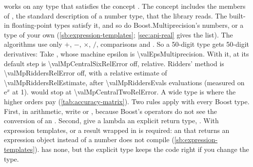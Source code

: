  works on any type that satisfies the concept . The concept includes the members of
, the standard description of a number type, that the library reads. The built-in
floating-point types satisfy it, and so do Boost.Multiprecision's numbers, or a type of your own
(\cref{sb:expression-templates}; \cref{sec:api-real} gives the list). The algorithms use only $+$, $-$, $\times$,
$/$, comparisons and . So a 50-digit type gets 50-digit derivatives:
Take , whose machine epsilon is \num{\valEpsMultiprecision}. With it,  at its
default step is \num{\valMpCentralSixRelError} off, relative. Ridders' method is \num{\valMpRiddersRelError} off, with
a relative estimate of \num{\valMpRiddersRelEstimate}, after \num{\valMpRiddersEvals} evaluations (measured on
$\mathrm{e}^x$ at 1).  would stop at \num{\valMpCentralTwoRelError}. A wide type is where the higher
orders pay (\cref{tab:accuracy-matrix}). Two rules apply with every Boost type. First, in arithmetic, write
 or , because Boost's operators do not see the conversion of an .
Second, give a lambda an explicit return type, . With expression templates,  or a
result wrapped in  is required: an  that returns an expression object instead of a number
does not compile (\cref{sb:expression-templates}).  has none, but the explicit type keeps the
code right if you change the type.

